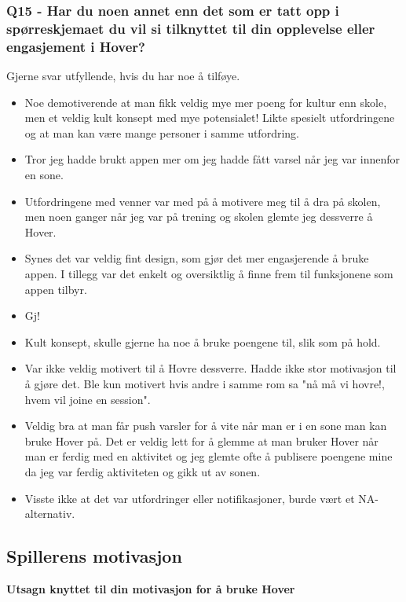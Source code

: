 \subsubsection*{Q15 - Har du noen annet enn det som er tatt opp i spørreskjemaet du vil si tilknyttet til din opplevelse eller engasjement i Hover?}
Gjerne svar utfyllende, hvis du har noe å tilføye.
\begin{itemize}[noitemsep]
	\item Noe demotiverende at man fikk veldig mye mer poeng for kultur enn skole, men et veldig kult konsept med mye potensialet! Likte spesielt utfordringene og at man kan være mange personer i samme utfordring.
	\item Tror jeg hadde brukt appen mer om jeg hadde fått varsel når jeg var innenfor en sone.
	\item Utfordringene med venner var med på å motivere meg til å dra på skolen, men noen ganger når jeg var på trening og skolen glemte jeg dessverre å Hover.
	\item Synes det var veldig fint design, som gjør det mer engasjerende å bruke appen. I tillegg var det enkelt og oversiktlig å finne frem til funksjonene som appen tilbyr.
	\item Gj!
	\item Kult konsept, skulle gjerne ha noe å bruke poengene til, slik som på hold.
	\item Var ikke veldig motivert til å Hovre dessverre. Hadde ikke stor motivasjon til å gjøre det. Ble kun motivert hvis andre i samme rom sa "nå må vi hovre!, hvem vil joine en session".
	\item Veldig bra at man får push varsler for å vite når man er i en sone man kan bruke Hover på. Det er veldig lett for å glemme at man bruker Hover når man er ferdig med en aktivitet og jeg glemte ofte å publisere poengene mine da jeg var ferdig aktiviteten og gikk ut av sonen.
	\item Visste ikke at det var utfordringer eller notifikasjoner, burde vært et NA-alternativ.
\end{itemize}






\newpage
\subsection*{Spillerens motivasjon}

\textbf{Utsagn knyttet til din motivasjon for å bruke Hover}

